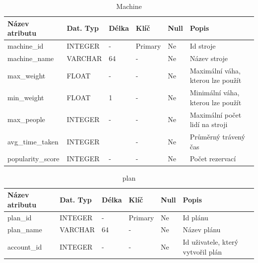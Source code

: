 \begin{table}[h!]
	\caption{Machine}
    \label{tab:dat-dictionary-machine}
	\begin{tabular}{|p{3.5cm}|p{2cm}|p{1cm}|p{2.5cm}|p{.75cm}|p{3.75cm}|}
		\hline
        \textbf{Název atributu} & \textbf{Dat. Typ} & \textbf{Délka} & \textbf{Klíč} & \textbf{Null} & \textbf{Popis} \\
        \hline
            machine\_id & INTEGER   &  -    & Primary       & Ne & Id stroje \\
            \hline
            machine\_name     & VARCHAR   &  64   & -                 & Ne & Název stroje \\
            \hline
            max\_weight       & FLOAT   &  -   & -                 & Ne &  Maximální váha, kterou lze použít \\
            \hline
            min\_weight       & FLOAT   &  1    & -                 & Ne &  Minimální váha, kterou lze použít \\
            \hline
            max\_people       & INTEGER   &  -  & -                 & Ne & Maximální počet lidí na stroji \\
            \hline
            avg\_time\_taken    & INTEGER   &     & -                 & Ne & Průměrný trávený čas \\
            \hline
            popularity\_score & INTEGER      &  -    & -                 & Ne &  Počet rezervací \\
        \hline
	\end{tabular}
\end{table}

\begin{table}[h!]
	\caption{plan}
    \label{tab:dat-dictionary-plan}
	\begin{tabular}{|p{3.5cm}|p{2cm}|p{1cm}|p{2.5cm}|p{.75cm}|p{3.75cm}|}
		\hline
        \textbf{Název atributu} & \textbf{Dat. Typ} & \textbf{Délka} & \textbf{Klíč} & \textbf{Null} & \textbf{Popis} \\
        \hline
            plan\_id & INTEGER   &  -    & Primary       & Ne & Id plánu \\
        \hline
            plan\_name     & VARCHAR   &  64   & -                 & Ne & Název plánu \\
        \hline
            account\_id     & INTEGER   &  -   & -                 & Ne & Id uživatele, který vytvořil plán \\
        \hline
	\end{tabular}
\end{table}

